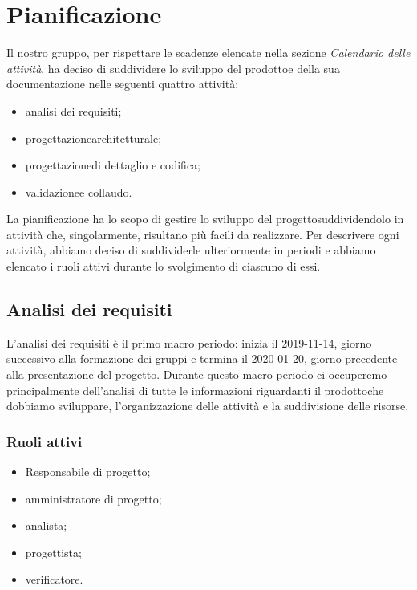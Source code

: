 \section{Pianificazione} 
Il nostro gruppo, per rispettare le scadenze elencate nella sezione \textit{Calendario delle attività}, ha deciso di suddividere lo sviluppo del prodotto\glosp e della sua documentazione nelle seguenti quattro attività:
\begin{itemize}
	\item analisi dei requisiti;
	\item progettazione\glosp architetturale;
	\item progettazione\glosp di dettaglio e codifica;
	\item validazione\glosp e collaudo.
\end{itemize}
La pianificazione ha lo scopo di gestire lo sviluppo del progetto\glosp suddividendolo in attività che, singolarmente, risultano più facili da realizzare. Per descrivere ogni attività, abbiamo deciso di suddividerle ulteriormente in periodi e abbiamo elencato i ruoli attivi durante lo svolgimento di ciascuno di essi.

\subsection{Analisi dei requisiti}
L'analisi dei requisiti è il primo macro periodo: inizia il 2019-11-14, giorno successivo alla formazione dei gruppi e termina il 2020-01-20, giorno precedente alla presentazione del progetto\glo. Durante questo macro periodo ci occuperemo principalmente dell'analisi di tutte le informazioni riguardanti il prodotto\glosp che dobbiamo sviluppare, l'organizzazione delle attività e la suddivisione delle risorse.

\subsubsection{Ruoli attivi}
\begin{itemize}
	\item Responsabile di progetto\glo;
	\item amministratore di progetto\glo;
	\item analista;
	\item progettista;
	\item verificatore.
\end{itemize}

